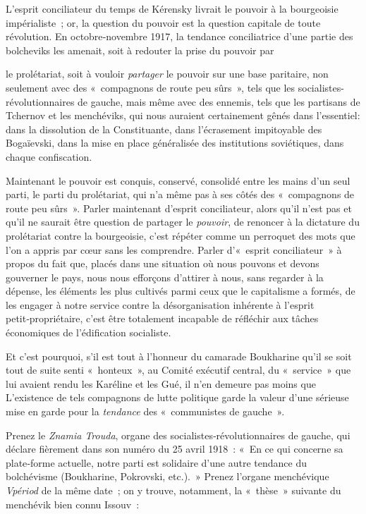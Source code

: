 \documentclass[french,twoside]{book} %
\begin{document}
L'esprit conciliateur du temps de Kérensky livrait le pouvoir à la bourgeoisie impérialiste ; or, la question du pouvoir est la question capitale de toute révolution. En octobre‑novembre 1917, la tendance conciliatrice d’une partie des bolcheviks les amenait, soit à redouter la prise du pouvoir par\par
le prolétariat, soit à vouloir \emph{partager} le pouvoir sur une base paritaire, non seulement avec des \hspace{1em}« compagnons de route peu sûrs », tels que les socialistes-révolutionnaires de gauche, mais même avec des ennemis, tels que les partisans de Tchernov et les menchéviks, qui nous auraient certainement gênés dans l’essentiel: dans la dissolution de la Constituante, dans l’écrasement impitoyable des Bogaïevski, dans la mise en place généralisée des institutions soviétiques, dans chaque confiscation.\par
Maintenant le pouvoir est conquis, conservé, consolidé entre les mains d’un seul parti, le parti du prolétariat, qui n’a même pas à ses côtés des « compagnons de route peu sûrs ». Parler maintenant d’esprit conciliateur, alors qu’il n’est pas et qu’il ne saurait être question de partager le \emph{pouvoir}, de renoncer à la dictature du prolétariat contre la bourgeoisie, c’est répéter comme un perroquet des mots que l’on a appris par cœur sans les comprendre. Parler d’« esprit conciliateur » à propos du fait que, placés dans une situation où nous pouvons et devons gouverner le pays, nous nous efforçons d’attirer à nous, sans regarder à la dépense, les éléments les plus cultivés parmi ceux que le capitalisme a formés, de les engager à notre service contre la désorganisation inhérente à l’esprit petit‑propriétaire, c’est être totalement incapable de réfléchir aux tâches économiques de l’édification socialiste.\par
Et c’est pourquoi, s’il est tout à l’honneur du camarade Boukharine qu’il se soit tout de suite senti « honteux », au Comité exécutif central, du « service » que lui avaient rendu les Karéline et les Gué, il n’en demeure pas moins que L’existence de tels compagnons de lutte politique garde la valeur d’une sérieuse mise en garde pour la \emph{tendance} des « communistes de gauche ».\par
Prenez le \emph{Znamia Trouda}, organe des socialistes‑révolutionnaires de gauche, qui déclare fièrement dans son numéro du 25 avril 1918 : « En ce qui concerne sa plate‑forme actuelle, notre parti est solidaire d’une autre tendance du bolchévisme (Boukharine, Pokrovski, etc.). » Prenez l’organe menchévique \emph{Vpériod} de la même date ; on y trouve, notamment, la « thèse » suivante du menchévik bien connu Issouv :\par
\end{document}
